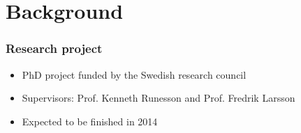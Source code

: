 \documentclass[11pt]{beamer} %
\begin{document}
\section{Background}
\begin{frame}
 \frametitle{Research project}
 \begin{itemize}
  \item PhD project funded by the Swedish research council
  \item Supervisors: Prof. Kenneth Runesson and Prof. Fredrik Larsson
  \item Expected to be finished in 2014
 \end{itemize}
\end{frame}

\end{document}
